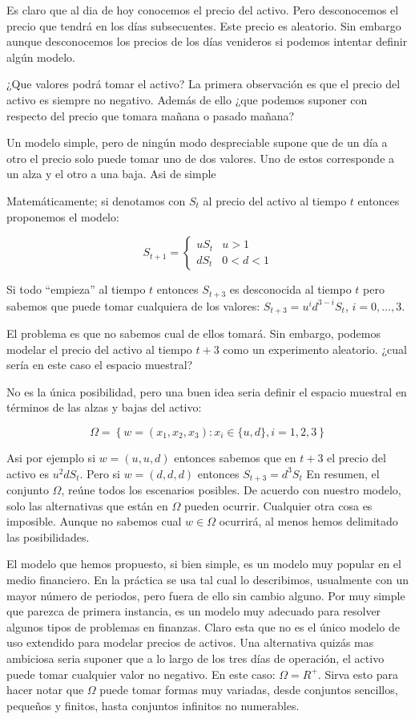 \documentclass[a4paper,12pt,twoside]{libro}
\theoremstyle{definition}
\begin{document}
Es claro que al dia de hoy conocemos el precio del activo. Pero desconocemos el precio que tendrá en los días subsecuentes. Este precio es aleatorio. Sin embargo aunque desconocemos los precios de los días venideros si podemos intentar definir algún modelo.

¿Que valores podrá tomar el activo? La primera observación es que el precio del activo es siempre no negativo. Además de ello ¿que podemos suponer con respecto del precio que tomara mañana o pasado mañana?

Un modelo simple, pero de ningún modo despreciable supone que de un día a otro el precio solo puede tomar uno de dos valores. Uno de estos corresponde a un alza y el otro a una baja. Asi de simple

Matemáticamente; si denotamos con $S_t$ al precio del activo al tiempo $t$ entonces proponemos el modelo:


$$
	S_{t+1} = \begin{cases}
		uS_t & u >1      \\
		dS_t & 0 < d < 1
	\end{cases}
$$

Si todo ``empieza'' al tiempo $t$ entonces $S_{t+3}$ es desconocida al tiempo $t$ pero sabemos que puede tomar cualquiera de los valores: $S_{t+3} = u^id^{3-i}S_t$, $i = 0,\ldots,3$.

El problema es que no sabemos cual de ellos tomará. Sin embargo, podemos modelar el precio del activo al tiempo $t+3$ como un experimento aleatorio. ¿cual sería en este caso el espacio muestral?


No es la única posibilidad, pero una buen idea seria definir el espacio muestral en términos de las alzas y bajas del activo:

$$
	\Omega = \left\{w = (x_1, x_2, x_3):x_i \in\{u,d\}, i=1, 2, 3\right\}
$$


Asi por ejemplo si $w = (u, u, d)$ entonces sabemos que en $t + 3$ el precio del activo es $u^2dS_t$. Pero si $w = (d, d, d)$ entonces $S_{t+3} = d^3S_t$ En resumen, el conjunto $\Omega$, reúne todos los escenarios posibles. De acuerdo con nuestro modelo, solo las alternativas que están en $\Omega$ pueden ocurrir. Cualquier otra cosa es imposible. Aunque no sabemos cual $w \in\Omega$ ocurrirá, al menos hemos delimitado las posibilidades.

El modelo que hemos propuesto, si bien simple, es un modelo muy popular en el medio financiero. En la práctica se usa tal cual lo describimos, usualmente con un mayor número de periodos, pero fuera de ello sin cambio alguno. Por muy simple que parezca de primera instancia, es un modelo muy adecuado para resolver algunos tipos de problemas en finanzas. Claro esta que no es el único modelo de uso extendido para modelar precios de activos. Una alternativa quizás mas ambiciosa seria suponer que a lo largo de los tres días de operación, el activo puede tomar cualquier valor no negativo. En este caso: $\Omega= R^+$.  Sirva esto para hacer notar que $\Omega$ puede tomar formas muy variadas, desde conjuntos sencillos, pequeños y finitos, hasta conjuntos infinitos no numerables.
\end{document}
